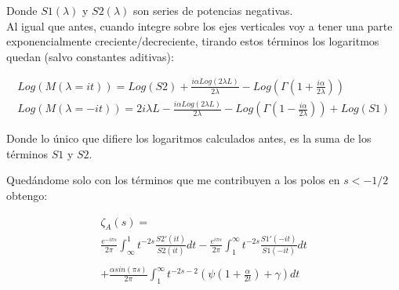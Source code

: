 Donde $S1 (\lambda ) $ y $S2 (\lambda)$ son series de potencias negativas.  \\

Al igual que antes, cuando integre sobre los ejes verticales voy a tener una parte exponencialmente creciente/decreciente, tirando estos términos los logaritmos quedan (salvo constantes aditivas):

\begin{equation}
\begin{array}{c}

Log ( M ( \lambda = i t ) ) =  Log(S2) + 
\frac{i \alpha Log(2 \lambda L)}{2 \lambda} - Log( \Gamma( 1 + \frac{i \alpha}{2 \lambda} ) ) \\

Log( M ( \lambda = -i t ) ) = 2 i \lambda L - \frac{i \alpha Log( 2 \lambda L )}{2 \lambda} - 
Log( \Gamma ( 1 - \frac{i \alpha}{2 \lambda} )) + Log(S1)

\end{array}
\end{equation}

Donde lo único que difiere los logaritmos calculados antes, es la suma de los términos $S1$ y $S2$.

Quedándome solo con los términos que me contribuyen a los polos en  $s < -1/2$ obtengo:

\begin{equation}
\begin{array}{c}
 \zeta _A (s) = \\
\frac{e ^{- i \pi s}}{2 \pi}
\int _{\infty} ^{1} t ^{-2s } 
		\frac{S2' (it)}{S2 (it)}
		d t
	- 
\frac{e ^{i \pi s}}{2 \pi}
\int _{1} ^{\infty} t ^{-2s } 
	\frac{S1' (-it)}{S1(-it)}
	d t
	 \\ \\
	+ \frac{\alpha sin( \pi s)}{2 \pi }	 \int _1 ^{\infty}
	t ^{-2s-2} \left( \psi \left( 1 + \frac{\alpha}{2 t}\right) + \gamma \right) dt


\end{array}
\end{equation}

\begin{comment}
\begin{equation}
\frac{1 }{2 \pi i}
\int _{circulo} \lambda ^{-2s } \partial \lambda \ Log \left[
					\frac{e ^{\frac{i \alpha Log( 2 \lambda L )}{2 \lambda}} e ^{2 i \lambda L} S1}
					{\Gamma \left( 1 - \frac{i \alpha}{2 \lambda} \right)} - 
					\frac{e ^{\frac{-i \alpha Log(2 \lambda L )}{2 \lambda}} S2}
					{\Gamma \left( 1 + \frac{i \alpha}{2 \lambda} \right)}					
					\right] d \lambda
\end{equation}
\end{comment}

